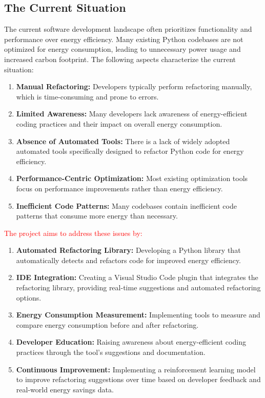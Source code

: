 \documentclass[12pt]{article}
\begin{document}
\subsection{The Current Situation}

The current software development landscape often prioritizes
functionality and performance over energy efficiency. Many existing
Python codebases are not optimized for energy consumption, leading to
unnecessary power usage and increased carbon footprint. The following
aspects characterize the current situation:
\begin{enumerate}
  \item \textbf{Manual Refactoring:} Developers typically perform
    refactoring manually, which is time-consuming and prone to errors.
  \item \textbf{Limited Awareness:} Many developers lack awareness of
    energy-efficient coding practices and their impact on overall
    energy consumption.
  \item \textbf{Absence of Automated Tools:} There is a lack of
    widely adopted automated tools specifically designed to refactor
    Python code for energy efficiency.
  \item \textbf{Performance-Centric Optimization:} Most existing
    optimization tools focus on performance improvements rather than
    energy efficiency.
  \item \textbf{Inefficient Code Patterns:} Many codebases contain
    inefficient code patterns that consume more energy than necessary.
\end{enumerate}

\textcolor{red}{The project aims to address these issues by:}
\begin{enumerate}
  \item \textbf{Automated Refactoring Library:} Developing a Python
    library that automatically detects and refactors code for
    improved energy efficiency.
  \item \textbf{IDE Integration:} Creating a Visual Studio Code
    plugin that integrates the refactoring library, providing
    real-time suggestions and automated refactoring options.
  \item \textbf{Energy Consumption Measurement:} Implementing tools
    to measure and compare energy consumption before and after refactoring.
  \item \textbf{Developer Education:} Raising awareness about
    energy-efficient coding practices through the tool's suggestions
    and documentation.
  \item \textbf{Continuous Improvement:} Implementing a reinforcement
    learning model to improve refactoring suggestions over time based
    on developer feedback and real-world energy savings data.
\end{enumerate}
\end{document}
